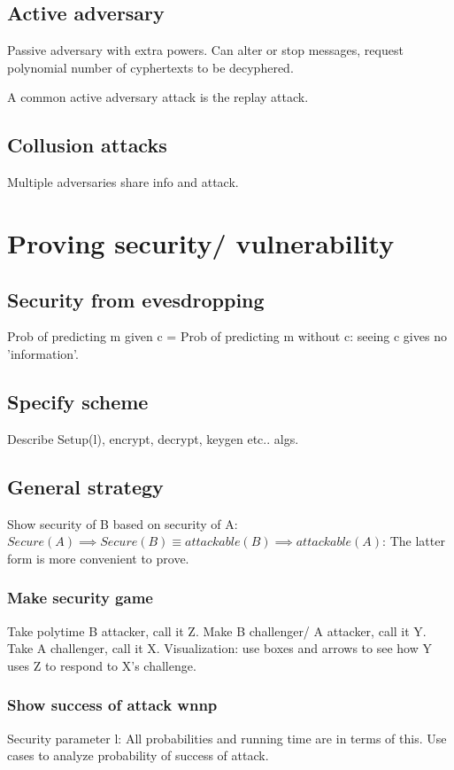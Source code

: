 \documentclass[oneside, article]{memoir}
\begin{document}
\subsection{Active adversary}
Passive adversary with extra powers. Can alter or stop messages, request polynomial number of cyphertexts to be decyphered. 

A common active adversary attack is the replay attack.

\subsection{Collusion attacks}
Multiple adversaries share info and attack.

\section{Proving security/ vulnerability}
\subsection{Security from evesdropping}
Prob of predicting m given c = Prob of predicting m without c: seeing c gives no 'information'.


\subsection{Specify scheme}
Describe Setup(l), encrypt, decrypt, keygen etc.. algs.

\subsection{General strategy}
Show security of B based on security of A: $Secure(A) \implies Secure(B) \equiv attackable(B) \implies attackable(A)$: The latter form is more convenient to prove.

\subsubsection{Make security game}
Take polytime B attacker, call it Z. Make B challenger/ A attacker, call it Y. Take A challenger, call it X. Visualization: use boxes and arrows to see how Y uses Z to respond to X's challenge.

\subsubsection{Show success of attack wnnp}
Security parameter l: All probabilities and running time are in terms of this. Use cases to analyze probability of success of attack.
\end{document}
